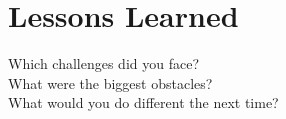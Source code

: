 \section{Lessons Learned}
Which challenges did you face? \\
What were the biggest obstacles? \\
What would you do different the next time?

